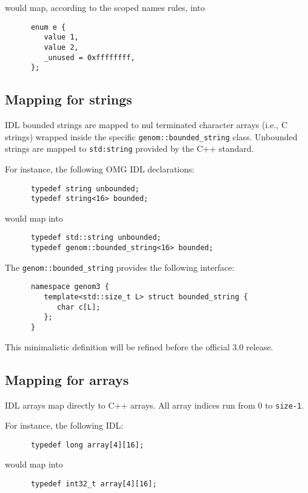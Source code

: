 would map, according to the scoped names rules, into
\begin{verbatim}
      enum e {
         value 1,
         value 2,
         _unused = 0xffffffff,
      };
\end{verbatim}

\subsection{Mapping for strings}

\GenoM{}  IDL bounded  strings are  mapped to  nul terminated  character arrays
(i.e.,  C strings)  wrapped  inside the  specific {\tt  genom::bounded\_string}
class. Unbounded strings are mapped to {\tt std:string} provided by the C++
standard.

For instance, the following OMG IDL declarations:
\begin{verbatim}
      typedef string unbounded;
      typedef string<16> bounded;
\end{verbatim}

would map into
\begin{verbatim}
      typedef std::string unbounded;
      typedef genom::bounded_string<16> bounded;
\end{verbatim}

The {\tt genom::bounded\_string} provides the following interface:
\begin{verbatim}
      namespace genom3 {
         template<std::size_t L> struct bounded_string {
            char c[L];
         };
      }
\end{verbatim}

This minimalistic definition will be refined before the official 3.0 \GenoM{}
release.


\subsection{Mapping for arrays}

\GenoM{} IDL arrays map directly to C++ arrays. All array indices run from 0 to
{\tt size-1}.

For instance, the following IDL:
\begin{verbatim}
      typedef long array[4][16];
\end{verbatim}

would map into
\begin{verbatim}
      typedef int32_t array[4][16];
\end{verbatim}


